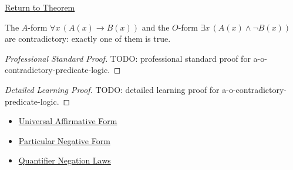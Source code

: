 \newpage
{}
\label{prf:a-o-contradictory-predicate-logic}

\begin{remark*}[Return]
\hyperref[prop:a-o-contradictory-predicate-logic]{Return to Theorem}
\end{remark*}

\begin{theorem*}[A-O Contradiction]
The \(A\)-form \(\forall x\,(A(x)\to B(x))\) and the \(O\)-form
\(\exists x\,(A(x)\land \neg B(x))\) are contradictory: exactly one of them is
true.
\end{theorem*}

\begin{proof}[Professional Standard Proof]
\LRAProofBodyStart
TODO: professional standard proof for a-o-contradictory-predicate-logic.
\end{proof}

\begin{proof}[Detailed Learning Proof]
\LRAProofBodyStart
TODO: detailed learning proof for a-o-contradictory-predicate-logic.
\end{proof}

\begin{remark*}
\end{remark*}

\begin{dependencies}
\begin{itemize}
  \item \hyperref[def:categorical-a-form-predicate-logic]{Universal Affirmative Form}
  \item \hyperref[def:categorical-o-form-predicate-logic]{Particular Negative Form}
  \item \hyperref[thm:qneg]{Quantifier Negation Laws}
\end{itemize}
\end{dependencies}

\clearpage

